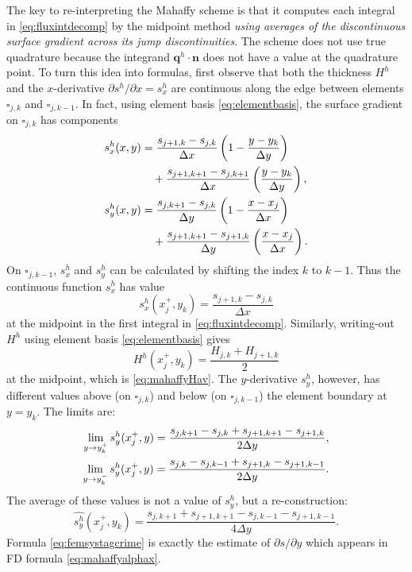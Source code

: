 \documentclass[review,letterpaper]{igs}
\newcommand\bn{\mathbf{n}}
\newcommand\bq{\mathbf{q}}
\begin{document}
The key to re-interpreting the Mahaffy scheme is that it computes each integral in \eqref{eq:fluxintdecomp} by the midpoint method \emph{using averages of the discontinuous surface gradient across its jump discontinuities}.  The scheme does not use true quadrature because the integrand $\bq^h\cdot \bn$ does not have a value at the quadrature point.  To turn this idea into formulas, first observe that both the thickness $H^h$ and the $x$-derivative $\partial s^h/\partial x = s^h_x$ are continuous along the edge between elements $\square_{j,k}$ and $\square_{j,k-1}$.  In fact, using element basis \eqref{eq:elementbasis}, the surface gradient on $\square_{j,k}$ has components
\begin{align}
s^h_x(x,y) &= \frac{s_{j+1,k}-s_{j,k}}{\Delta x} \left(1-\frac{y-y_k}{\Delta y}\right)  \label{eq:grads} \\
   &\quad + \frac{s_{j+1,k+1}-s_{j,k+1}}{\Delta x} \left(\frac{y-y_k}{\Delta y}\right), \notag \\
s^h_y(x,y) &= \frac{s_{j,k+1}-s_{j,k}}{\Delta y} \left(1-\frac{x-x_j}{\Delta x}\right) \notag \\
   &\quad + \frac{s_{j+1,k+1}-s_{j+1,k}}{\Delta y} \left(\frac{x-x_j}{\Delta x}\right). \notag
\end{align}
On $\square_{j,k-1}$, $s^h_x$ and $s^h_y$ can be calculated by shifting the index $k$ to $k-1$.  Thus the continuous function $s^h_x$ has value
\begin{equation}
s^h_x(x_j^+,y_k) = \frac{s_{j+1,k}-s_{j,k}}{\Delta x} \label{eq:femsxstag}
\end{equation}
at the midpoint in the first integral in \eqref{eq:fluxintdecomp}.  Similarly, writing-out $H^h$ using element basis \eqref{eq:elementbasis} gives
\begin{equation}
H^h(x_j^+,y_k) = \frac{H_{j,k}+H_{j+1,k}}{2} \label{eq:femHstag}
\end{equation}
at the midpoint, which is \eqref{eq:mahaffyHav}.  The $y$-derivative $s^h_y$, however, has different values above (on $\square_{j,k}$) and below (on $\square_{j,k-1}$) the element boundary at $y = y_k$.  The limits are:
\begin{align}
\lim_{y\to y_k^+} s^h_y(x_j^+,y) = \frac{s_{j,k+1}-s_{j,k} + s_{j+1,k+1}-s_{j+1,k}}{2\Delta y}, \\
\lim_{y\to y_k^-} s^h_y(x_j^+,y) = \frac{s_{j,k}-s_{j,k-1} + s_{j+1,k}-s_{j+1,k-1}}{2\Delta y}. \notag
\end{align}
The average of these values is not a value of $s_y^h$, but a re-construction:
\begin{equation}
\widehat{s^h_y}(x_j^+,y_k) = \frac{s_{j,k+1} + s_{j+1,k+1} - s_{j,k-1} - s_{j+1,k-1}}{4\Delta y}. \label{eq:femsystagcrime}
\end{equation}
Formula \eqref{eq:femsystagcrime} is exactly the estimate of $\partial s/\partial y$ which appears in FD formula \eqref{eq:mahaffyalphax}.
\end{document}
